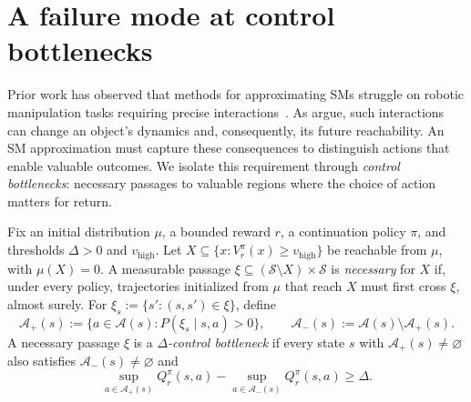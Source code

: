 \section{A failure mode at control bottlenecks}
\label{sec:failure}
\label{sec:exp-failure} %

Prior work has observed that methods for approximating SMs struggle on robotic manipulation tasks requiring precise interactions~\citep{cetin-rlj24a,shen-arxiv26a,mohan-rlbrew26a}. As \citet{shen-arxiv26a} argue, such interactions can change an object's dynamics and, consequently, its future reachability. 
An SM approximation must capture these consequences to distinguish actions that enable valuable outcomes.
We isolate this requirement through \emph{control bottlenecks}: necessary passages to valuable regions where the choice of action matters for return.

\begin{definition}
\label{def:control-bottleneck}
Fix an initial distribution $\mu$, a bounded reward $r$, a continuation policy $\pi$, and thresholds $\Delta>0$ and $v_{\mathrm{high}}$.
Let $X\subseteq\{x:V_r^\pi(x)\ge v_{\mathrm{high}}\}$ be reachable from $\mu$, with $\mu(X)=0$.
A measurable passage $\xi\subseteq(\mathcal S\setminus X)\times\mathcal S$ is \emph{necessary} for $X$ if, under every policy, trajectories initialized from $\mu$ that reach $X$ must first cross $\xi$, almost surely.
For $\xi_s:=\{s':(s,s')\in\xi\}$, define
\[
    \mathcal A_+(s):=\{a\in\mathcal A(s):P(\xi_s\mid s,a)>0\}, \qquad \mathcal A_-(s):=\mathcal A(s)\setminus\mathcal A_+(s).
\]
A necessary passage $\xi$ is a \emph{$\Delta$-control bottleneck} if every state $s$ with $\mathcal A_+(s)\neq\varnothing$ also satisfies $\mathcal A_-(s)\neq\varnothing$ and
\[
    \sup_{a\in\mathcal A_+(s)}Q_r^\pi(s,a) - \sup_{a\in\mathcal A_-(s)}Q_r^\pi(s,a)
    \ge\Delta.
\]
\end{definition}


